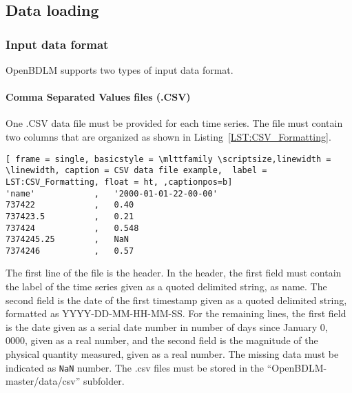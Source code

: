 \subsection{Data loading}
\label{S:DATALOADING}
\subsubsection{Input data format}

OpenBDLM supports two types of input data format.


\paragraph{Comma Separated Values files (.CSV)}
\label{SS:CSVInput}

One .CSV data file must be provided for each time series.
The file must contain two columns that are organized as shown in Listing~\ref{LST:CSV_Formatting}.
\begin{lstlisting}[ frame = single, basicstyle = \mlttfamily \scriptsize,linewidth = \linewidth, caption = CSV data file example,  label = LST:CSV_Formatting, float = ht, ,captionpos=b]
'name'            ,   '2000-01-01-22-00-00'
737422            ,   0.40
737423.5          ,   0.21
737424            ,   0.548
7374245.25        ,   NaN
7374246           ,   0.57
\end{lstlisting}    
The first line of the file is the header.
In the header, the first field must contain the label of the time series given as a quoted delimited string, as \textquotesingle name\textquotesingle .
The second field is the date of the first timestamp given as a quoted delimited string, formatted as \textquotesingle YYYY-DD-MM-HH-MM-SS\textquotesingle.  
For the remaining lines, the first field is the date given as a serial date number in number of days since January 0, 0000, given as a real number, and the second field is the magnitude of the physical quantity measured, given as a real number.
The missing data must be indicated as \lstinline[basicstyle = \mlttfamily \small ]!NaN! number.
The .csv files must be stored in the ``OpenBDLM-master/data/csv'' subfolder.

